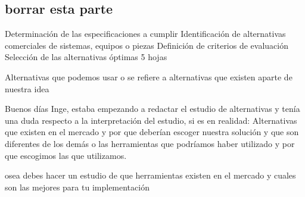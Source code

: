 \subsection{borrar esta parte}
Determinación de las especificaciones a cumplir
Identificación de alternativas comerciales de
sistemas, equipos o piezas
Definición de criterios de evaluación
Selección de las alternativas óptimas
5 hojas


Alternativas que podemos usar o se refiere a alternativas que existen aparte de nuestra idea

Buenos días Inge, estaba empezando a redactar el estudio de alternativas y tenía una duda respecto a la interpretación del estudio, si es en realidad:
Alternativas que existen en el mercado y por que deberían escoger nuestra solución y que son diferentes de los demás o las herramientas que podríamos haber utilizado y por que escogimos las que utilizamos.


osea debes hacer un estudio de que herramientas existen en el mercado y cuales son las mejores para tu implementación